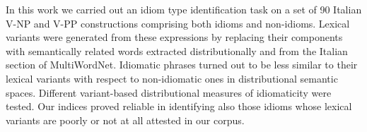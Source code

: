 In this work we carried out an idiom type identification task on a set of 90 Italian V-NP and V-PP constructions comprising both idioms and non-idioms. Lexical variants were generated from these expressions by replacing their components with semantically related words extracted distributionally and from the Italian section of MultiWordNet. Idiomatic phrases turned out to be less similar to their lexical variants with respect to non-idiomatic ones in distributional semantic spaces. Different variant-based distributional measures of idiomaticity were tested. Our indices proved reliable in identifying also those idioms whose lexical variants are poorly or not at all attested in our corpus.
